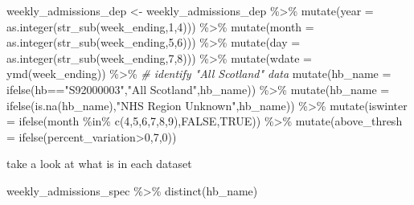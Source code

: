\documentclass[
]{article}
\newenvironment{Shaded}{\begin{snugshade}}{\end{snugshade}}
\newcommand{\AttributeTok}[1]{\textcolor[rgb]{0.77,0.63,0.00}{#1}}
\newcommand{\CommentTok}[1]{\textcolor[rgb]{0.56,0.35,0.01}{\textit{#1}}}
\newcommand{\ConstantTok}[1]{\textcolor[rgb]{0.00,0.00,0.00}{#1}}
\newcommand{\DecValTok}[1]{\textcolor[rgb]{0.00,0.00,0.81}{#1}}
\newcommand{\FunctionTok}[1]{\textcolor[rgb]{0.00,0.00,0.00}{#1}}
\newcommand{\NormalTok}[1]{#1}
\newcommand{\OtherTok}[1]{\textcolor[rgb]{0.56,0.35,0.01}{#1}}
\newcommand{\SpecialCharTok}[1]{\textcolor[rgb]{0.00,0.00,0.00}{#1}}
\newcommand{\StringTok}[1]{\textcolor[rgb]{0.31,0.60,0.02}{#1}}
\begin{document}
\begin{Shaded}
\begin{Highlighting}[]
\NormalTok{weekly\_admissions\_dep }\OtherTok{\textless{}{-}}\NormalTok{ weekly\_admissions\_dep }\SpecialCharTok{\%\textgreater{}\%} 
  \FunctionTok{mutate}\NormalTok{(}\AttributeTok{year =} \FunctionTok{as.integer}\NormalTok{(}\FunctionTok{str\_sub}\NormalTok{(week\_ending,}\DecValTok{1}\NormalTok{,}\DecValTok{4}\NormalTok{))) }\SpecialCharTok{\%\textgreater{}\%} 
  \FunctionTok{mutate}\NormalTok{(}\AttributeTok{month =} \FunctionTok{as.integer}\NormalTok{(}\FunctionTok{str\_sub}\NormalTok{(week\_ending,}\DecValTok{5}\NormalTok{,}\DecValTok{6}\NormalTok{))) }\SpecialCharTok{\%\textgreater{}\%} 
  \FunctionTok{mutate}\NormalTok{(}\AttributeTok{day =} \FunctionTok{as.integer}\NormalTok{(}\FunctionTok{str\_sub}\NormalTok{(week\_ending,}\DecValTok{7}\NormalTok{,}\DecValTok{8}\NormalTok{))) }\SpecialCharTok{\%\textgreater{}\%} 
  \FunctionTok{mutate}\NormalTok{(}\AttributeTok{wdate =} \FunctionTok{ymd}\NormalTok{(week\_ending)) }\SpecialCharTok{\%\textgreater{}\%} 
  \CommentTok{\# identify "All Scotland" data}
  \FunctionTok{mutate}\NormalTok{(}\AttributeTok{hb\_name =} \FunctionTok{ifelse}\NormalTok{(hb}\SpecialCharTok{==}\StringTok{"S92000003"}\NormalTok{,}\StringTok{"All Scotland"}\NormalTok{,hb\_name)) }\SpecialCharTok{\%\textgreater{}\%} 
  \FunctionTok{mutate}\NormalTok{(}\AttributeTok{hb\_name =} \FunctionTok{ifelse}\NormalTok{(}\FunctionTok{is.na}\NormalTok{(hb\_name),}\StringTok{"NHS Region Unknown"}\NormalTok{,hb\_name)) }\SpecialCharTok{\%\textgreater{}\%} 
  \FunctionTok{mutate}\NormalTok{(}\AttributeTok{iswinter =} \FunctionTok{ifelse}\NormalTok{(month }\SpecialCharTok{\%in\%} \FunctionTok{c}\NormalTok{(}\DecValTok{4}\NormalTok{,}\DecValTok{5}\NormalTok{,}\DecValTok{6}\NormalTok{,}\DecValTok{7}\NormalTok{,}\DecValTok{8}\NormalTok{,}\DecValTok{9}\NormalTok{),}\ConstantTok{FALSE}\NormalTok{,}\ConstantTok{TRUE}\NormalTok{)) }\SpecialCharTok{\%\textgreater{}\%} 
  \FunctionTok{mutate}\NormalTok{(}\AttributeTok{above\_thresh =} \FunctionTok{ifelse}\NormalTok{(percent\_variation}\SpecialCharTok{\textgreater{}}\DecValTok{0}\NormalTok{,}\DecValTok{7}\NormalTok{,}\DecValTok{0}\NormalTok{))}
\end{Highlighting}
\end{Shaded}

take a look at what is in each dataset

\begin{Shaded}
\begin{Highlighting}[]
\NormalTok{weekly\_admissions\_spec }\SpecialCharTok{\%\textgreater{}\%} 
  \FunctionTok{distinct}\NormalTok{(hb\_name)}
\end{Highlighting}
\end{Shaded}
\end{document}
